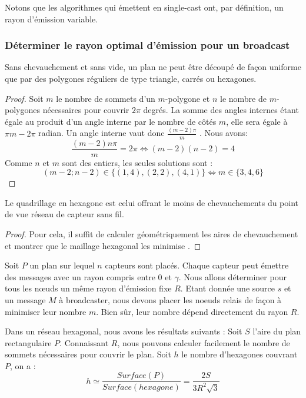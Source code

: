 Notons que les algorithmes qui émettent en single-cast ont, par définition, un rayon d'émission variable.

\subsubsection{Déterminer le rayon optimal d'émission pour un broadcast}
\begin{myth}
Sans chevauchement et sans vide, un plan ne peut être découpé de façon uniforme que par des polygones réguliers de type triangle, carrés ou hexagones.
\end{myth}
\begin{proof}
Soit $m$ le nombre de sommets d'un $m$-polygone et $n$ le nombre de $m$-polygones nécessaires pour couvrir $2\pi$ degrés. La somme des angles internes étant égale au produit d'un 
angle interne par le nombre de côtés $m$, elle sera égale à $\pi m-2 \pi$  radian. Un angle interne vaut donc $\frac{(m-2)\pi }{m}$ . Nous avons: 
$$\frac{(m-2)n\pi}{m}=2\pi \Leftrightarrow (m-2)(n-2)=4$$
Comme $n$ et $m$ sont des entiers, les seules solutions sont : 
$$(m-2;n-2)\in\{(1,4),(2,2),(4,1) \} \Leftrightarrow m \in \{ 3,4,6 \}$$
\end{proof}

\begin{myth}
Le quadrillage en hexagone est celui offrant le moins de chevauchements du point de vue réseau de capteur sans fil. 
\end{myth}
\begin{proof}
Pour cela, il suffit de calculer géométriquement les aires de chevauchement et montrer que le maillage hexagonal les minimise \cite{Yang2006}.
\end{proof}



Soit $P$ un plan sur lequel $n$ capteurs sont placés. Chaque capteur peut émettre des messages avec un rayon compris entre 0 et $\gamma$. Nous allons déterminer pour tous les nœuds un même rayon d'émission fixe $R$.
Etant donnée une source $s$ et un message $M$ à broadcaster, nous devons placer les noeuds relais de façon à minimiser leur nombre $m$. Bien sûr, leur nombre dépend directement du rayon $R$.
 

Dans un réseau hexagonal, nous avons les résultats suivants :
Soit $S$ l'aire du plan rectangulaire $P$. Connaissant $R$, nous pouvons calculer facilement le nombre de sommets nécessaires pour couvrir le plan.
Soit $h$ le nombre d'hexagones couvrant $P$, on a : 
$$h \simeq \frac{Surface ( P)}{Surface(hexagone)}=\frac{2S}{3R^2 \sqrt{3}}$$

